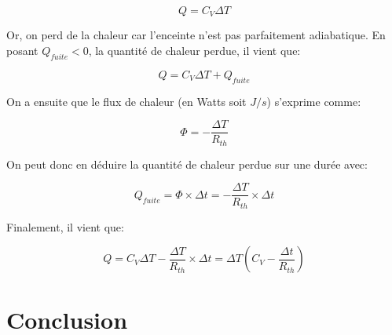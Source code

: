 \documentclass[12pt]{article}
\begin{document}
\begin{equation}
	Q = C_V \Delta T
\end{equation}

Or, on perd de la chaleur car l'enceinte n'est pas parfaitement adiabatique. En posant $Q_{fuite} < 0$, la quantité de chaleur perdue, il vient que:

\begin{equation}
	Q = C_V \Delta T + Q_{fuite}
\end{equation}

On a ensuite que le flux de chaleur (en Watts soit $J/s$) s'exprime comme:

\begin{equation}
	\Phi = - \frac{\Delta T}{R_{th}}
\end{equation}

On peut donc en déduire la quantité de chaleur perdue sur une durée avec:

\begin{equation}
	Q_{fuite} = \Phi \times \Delta t = - \frac{\Delta T}{R_{th}} \times \Delta t
\end{equation}

Finalement, il vient que:

\begin{equation}
	Q = C_V \Delta T - \frac{\Delta T}{R_{th}} \times \Delta t = \Delta T \left( C_V - \frac{\Delta t}{R_{th}} \right)
\end{equation}

\section{Conclusion}
\end{document}

